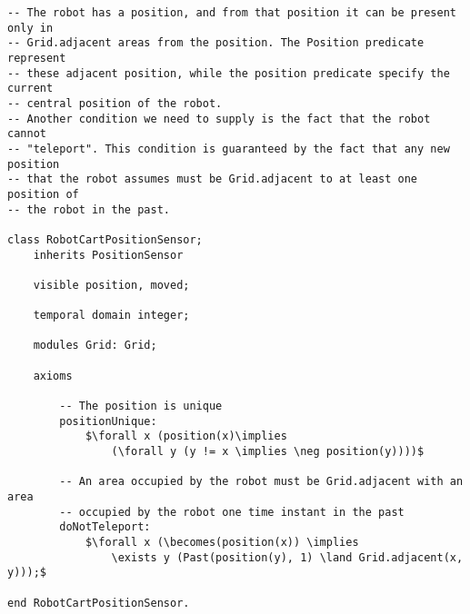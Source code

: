\begin{lstlisting}[fontadjust, mathescape, frame=single] 
-- The robot has a position, and from that position it can be present only in
-- Grid.adjacent areas from the position. The Position predicate represent 
-- these adjacent position, while the position predicate specify the current 
-- central position of the robot.
-- Another condition we need to supply is the fact that the robot cannot 
-- "teleport". This condition is guaranteed by the fact that any new position
-- that the robot assumes must be Grid.adjacent to at least one position of 
-- the robot in the past.

class RobotCartPositionSensor; 
    inherits PositionSensor
    
    visible position, moved;
    
    temporal domain integer;

    modules Grid: Grid;
    
    axioms
    
        -- The position is unique
        positionUnique: 
            $\forall x (position(x)\implies 
                (\forall y (y != x \implies \neg position(y))))$            

        -- An area occupied by the robot must be Grid.adjacent with an area
        -- occupied by the robot one time instant in the past
        doNotTeleport:
            $\forall x (\becomes(position(x)) \implies 
                \exists y (Past(position(y), 1) \land Grid.adjacent(x, y)));$
            
end RobotCartPositionSensor.
\end{lstlisting}